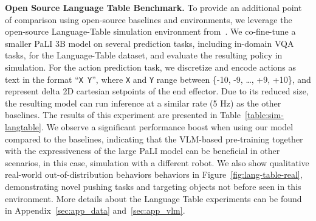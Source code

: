 \textbf{Open Source Language Table Benchmark.} To provide an additional point of comparison using open-source baselines and environments, we leverage the open-source Language-Table simulation environment from~\citet{lynch2022interactive}. We co-fine-tune a smaller PaLI 3B model on several prediction tasks, including in-domain VQA tasks, for the Language-Table dataset, and evaluate the resulting policy in simulation. For the action prediction task, we discretize and encode actions as text in the format ``\texttt{X Y}'', where \texttt{X} and \texttt{Y} range between \{-10, -9, \ldots, +9, +10\}, and represent delta 2D cartesian setpoints of the end effector. Due to its reduced size, the resulting model can run inference at a similar rate (5 Hz) as the other baselines. 
The results of this experiment are presented in Table~\ref{table:sim-langtable}. We observe a significant performance boost when using our model compared to the baselines, indicating that the VLM-based pre-training together with the expressiveness of the large PaLI model can be beneficial in other scenarios, in this case, simulation with a different robot.
We also show qualitative real-world out-of-distribution behaviors behaviors in Figure~\ref{fig:lang-table-real}, demonstrating novel pushing tasks and targeting objects not before seen in this environment. 
More details about the Language Table experiments can be found in Appendix~\ref{sec:app_data} and~\ref{sec:app_vlm}.

\begin{figure}
\begin{floatrow}
\hspace{-0.2cm}
\end{floatrow}
\end{figure}

